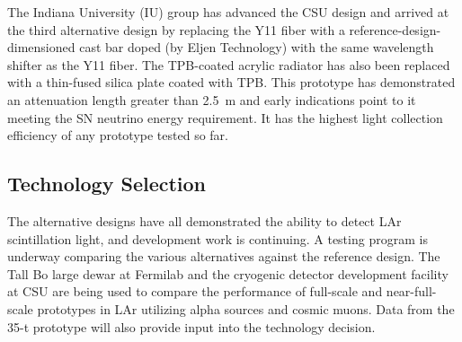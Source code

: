 The Indiana University (IU) group has advanced the CSU design and
arrived at the third alternative design by replacing the Y11 fiber
with a reference-design-dimensioned cast bar doped (by Eljen
Technology) with the same wavelength shifter as the Y11 fiber. The
TPB-coated acrylic radiator has also been replaced with a thin-fused
silica plate coated with TPB. This prototype has demonstrated an
attenuation length greater than 2.5~m and early indications point to
it meeting the SN neutrino energy requirement. It has the highest
light collection efficiency of any prototype tested so far.

\subsection{Technology Selection}

The alternative designs have all demonstrated the ability to detect
LAr scintillation light, and development work is continuing. A testing
program is underway comparing the various alternatives against the
reference design.  The Tall Bo large dewar at Fermilab and the
cryogenic detector development facility at CSU are being used to
compare the performance of full-scale and near-full-scale prototypes
in LAr utilizing alpha sources and cosmic muons. Data from the 35-t
prototype will also provide input into the technology decision. %
